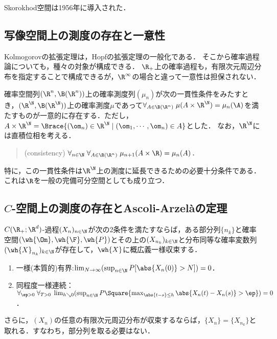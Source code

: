 \documentclass[uplatex,dvipdfmx]{jsreport}
\begin{document}
\begin{history}
    Skorokhod空間は1956年に導入された．
\end{history}

\subsection{写像空間上の測度の存在と一意性}

\begin{tcolorbox}[colframe=ForestGreen, colback=ForestGreen!10!white,breakable,colbacktitle=ForestGreen!40!white,coltitle=black,fonttitle=\bfseries\sffamily,
    title=]
    Kolmogorovの拡張定理は，Hopfの拡張定理の一般化である．
    そこから確率過程論についても，種々の対象が構成できる．
    $\R_+$上の確率過程も，有限次元周辺分布を指定することで構成できるが，$\R^\infty$の場合と違って一意性は担保されない．
\end{tcolorbox}

\begin{theorem}[帰納極限の構成]
    確率空間列$(\R^n,\B(\R^n))$上の確率測度列$(\mu_n)$が次の一貫性条件をみたすとき，$(\R^\N,\B(\R^\N))$上の確率測度$\mu$であって$\forall_{A\in\B(\R^n)}\;\mu(A\times\R^\N)=\mu_n(\A)$を満たすものが一意的に存在する．ただし，
    $A\times\R^\N=\Brace{(\om_n)\in\R^\N\mid (\om_1,\cdots,\om_n)\in A}$とした．
    なお，$\R^\N$には直積位相を考える．
    \begin{quotation}
        (consistency) $\forall_{n\in\N}\;\forall_{A\in\B(\R^n)}\;\mu_{n+1}(A\times\R)=\mu_n(A)$．
    \end{quotation}
    特に，この一貫性条件は$\R^\N$上の測度に延長できるための必要十分条件である．
    これは$\R$を一般の完備可分空間としても成り立つ．
\end{theorem}

\subsection{$C$-空間上の測度の存在とAscoli-Arzelàの定理}

\begin{theorem}
    $C(\R_+;\R^d)$-過程$(X_n)_{n\in\N}$が次の2条件を満たすならば，ある部分列$\{n_k\}$と確率空間$(\wh{\Om},\wh{\F},\wh{P})$とその上の$(X_{n_k})_{k\in\N}$と分布同等な確率変数列$(\wh{X}_{n_k})_{k\in\N}$が存在して，$\wh{X}$に概広義一様収束する．
    \begin{enumerate}
        \item 一様(本質的)有界:$\lim_{N\to\infty}(\sup_{n\in\N}P[\abs{X_n(0)}>N])=0$．
        \item 同程度一様連続：$\forall_{\ep>0}\;\forall_{T>0}\;\lim_{h\searrow0}(\sup_{n\in\N}P\Square{\max_{\abs{t-s}\le h}\abs{X_n(t)-X_n(s)}>\ep})=0$．
    \end{enumerate}
    さらに，$(X_n)$の任意の有限次元周辺分布が収束するならば，$\{X_n\}=\{X_{n_k}\}$と取れる．すなわち，部分列を取る必要はない．
\end{theorem}
\end{document}
